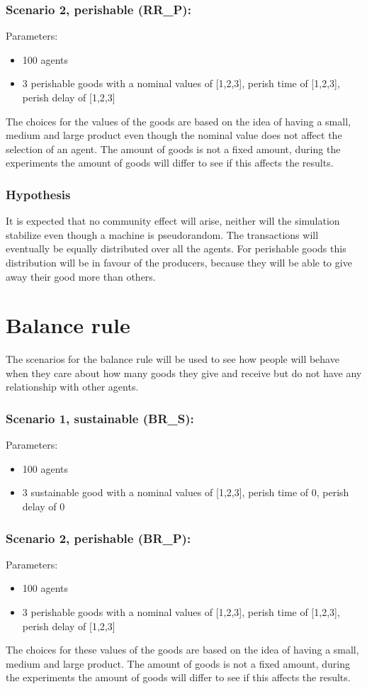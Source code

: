 \documentclass[twoside,openright]{uva-bachelor-thesis}
\begin{document}
\subsubsection{Scenario 2, perishable (RR\_P):}
Parameters:
\begin{itemize}
\item	100 agents
\item	3 perishable goods with a nominal values of [1,2,3], perish time of [1,2,3], perish delay of [1,2,3]
\end{itemize}
The choices for the values of the goods are based on the idea of having a small, medium and large product even though the nominal value does not affect the selection of an agent. The amount of goods is not a fixed amount, during the experiments the amount of goods will differ to see if this affects the results.

\subsubsection{Hypothesis}
It is expected that no community effect will arise, neither will the simulation stabilize even though a machine is pseudorandom. The transactions will eventually be equally distributed over all the agents. For perishable goods this distribution will be in favour of the producers, because they will be able to give away their good more than others.

\section{Balance rule}
The scenarios for the balance rule will be used to see how people will behave when they care about how many goods they give and receive but do not have any relationship with other agents.
\subsubsection{Scenario 1, sustainable (BR\_S):}
Parameters:
\begin{itemize}
\item	100 agents
\item	3 sustainable good with a nominal values of [1,2,3], perish time of 0, perish delay of 0
\end{itemize}
\subsubsection{Scenario 2, perishable (BR\_P):}
Parameters:
\begin{itemize}
\item	100 agents
\item	3 perishable goods with a nominal values of [1,2,3], perish time of [1,2,3], perish delay of [1,2,3]
\end{itemize}
The choices for these values of the goods are based on the idea of having a small, medium and large product. The amount of goods is not a fixed amount, during the experiments the amount of goods will differ to see if this affects the results.
\end{document}
